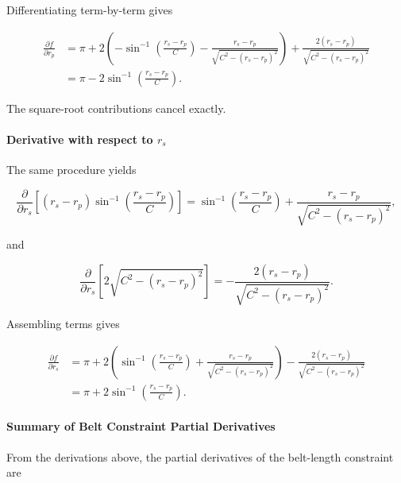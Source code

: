\documentclass[11pt]{article}
\numberwithin{equation}{section}
\begin{document}
Differentiating  term-by-term gives

\begin{align}
\frac{\partial f}{\partial r_p}
&=
\pi
+
2\left(
-\sin^{-1}\!\left(\frac{r_s-r_p}{C}\right)
-
\frac{r_s-r_p}
{\sqrt{C^2-(r_s-r_p)^2}}
\right)
+
\frac{2(r_s-r_p)}
{\sqrt{C^2-(r_s-r_p)^2}}
\nonumber\\[6pt]
&=
\pi
-
2\sin^{-1}\!\left(\frac{r_s-r_p}{C}\right).
\label{eq:dfdrp_final}
\end{align}

The square-root contributions cancel exactly.

\paragraph{Derivative with respect to $r_s$}

The same procedure yields

\begin{equation}
\frac{\partial}{\partial r_s}
\left[
(r_s-r_p)\sin^{-1}\!\left(\frac{r_s-r_p}{C}\right)
\right]
=
\sin^{-1}\!\left(\frac{r_s-r_p}{C}\right)
+
\frac{r_s-r_p}{\sqrt{C^2-(r_s-r_p)^2}},
\label{eq:prod_asin_rs}
\end{equation}

and

\begin{equation}
\frac{\partial}{\partial r_s}
\left[
2\sqrt{C^2-(r_s-r_p)^2}
\right]
=
-\frac{2(r_s-r_p)}
{\sqrt{C^2-(r_s-r_p)^2}}.
\label{eq:sqrt_general_rs}
\end{equation}

Assembling terms gives

\begin{align}
\frac{\partial f}{\partial r_s}
&=
\pi
+
2\left(
\sin^{-1}\!\left(\frac{r_s-r_p}{C}\right)
+
\frac{r_s-r_p}
{\sqrt{C^2-(r_s-r_p)^2}}
\right)
-
\frac{2(r_s-r_p)}
{\sqrt{C^2-(r_s-r_p)^2}}
\nonumber\\[6pt]
&=
\pi
+
2\sin^{-1}\!\left(\frac{r_s-r_p}{C}\right).
\label{eq:dfdrs_final}
\end{align}


\paragraph{Summary of Belt Constraint Partial Derivatives}

From the derivations above, the partial derivatives of the belt-length
constraint  are
\end{document}
